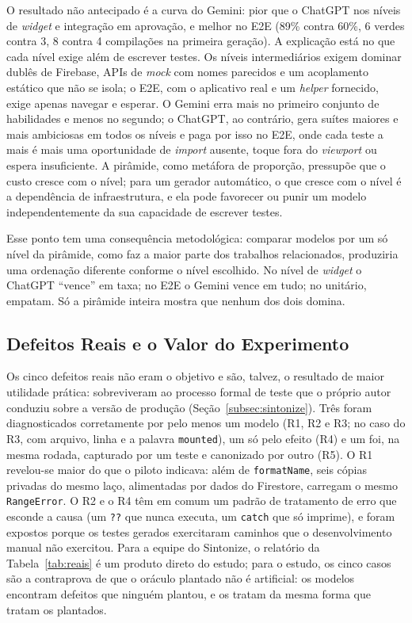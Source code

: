 \documentclass[12pt]{article}
\begin{document}
O resultado não antecipado é a curva do Gemini: pior que o ChatGPT
nos níveis de \textit{widget} e integração em aprovação, e melhor no E2E
(89\% contra 60\%, 6 verdes contra 3, 8 contra 4 compilações na primeira
geração). A explicação está no que cada nível exige além de escrever
testes. Os níveis intermediários exigem dominar dublês de Firebase, APIs de
\textit{mock} com nomes parecidos e um acoplamento estático que não se
isola; o E2E, com o aplicativo real e um \textit{helper} fornecido, exige
apenas navegar e esperar. O Gemini erra mais no primeiro conjunto de
habilidades e menos no segundo; o ChatGPT, ao contrário, gera suítes maiores
e mais ambiciosas em todos os níveis e paga por isso no E2E, onde cada
teste a mais é mais uma oportunidade de \textit{import} ausente, toque fora
do \textit{viewport} ou espera insuficiente. A pirâmide, como metáfora de
proporção, pressupõe que o custo cresce com o nível; para um gerador
automático, o que cresce com o nível é a dependência de infraestrutura, e
ela pode favorecer ou punir um modelo independentemente da sua capacidade
de escrever testes.

Esse ponto tem uma consequência metodológica: comparar modelos por um só
nível da pirâmide, como faz a maior parte dos trabalhos relacionados,
produziria uma ordenação diferente conforme o nível escolhido. No nível de
\textit{widget} o ChatGPT ``vence'' em taxa; no E2E o Gemini vence em tudo;
no unitário, empatam. Só a pirâmide inteira mostra que nenhum dos dois
domina.

\subsection{Defeitos Reais e o Valor do Experimento}
\label{subsec:disc-reais}

Os cinco defeitos reais não eram o objetivo e são, talvez, o resultado de
maior utilidade prática: sobreviveram ao processo formal de teste que o
próprio autor conduziu sobre a versão de produção (Seção~\ref{subsec:sintonize}). Três foram diagnosticados corretamente por pelo
menos um modelo (R1, R2 e R3; no caso do R3, com arquivo, linha e a
palavra \texttt{mounted}), um só pelo efeito (R4) e um foi, na mesma rodada, capturado por um teste e
canonizado por outro (R5). O R1 revelou-se maior do que o piloto indicava: além de
\texttt{formatName}, seis cópias privadas do mesmo laço, alimentadas por
dados do Firestore, carregam o mesmo \texttt{RangeError}. O R2 e o R4 têm em
comum um padrão de tratamento de erro que esconde a causa (um \texttt{??}
que nunca executa, um \texttt{catch} que só imprime), e foram expostos
porque os testes gerados exercitaram caminhos que o desenvolvimento manual
não exercitou. Para a equipe do Sintonize, o relatório da
Tabela~\ref{tab:reais} é um produto direto do estudo; para o estudo, os
cinco casos são a contraprova de que o oráculo plantado não é artificial: os
modelos encontram defeitos que ninguém plantou, e os tratam da mesma forma
que tratam os plantados.
\end{document}
